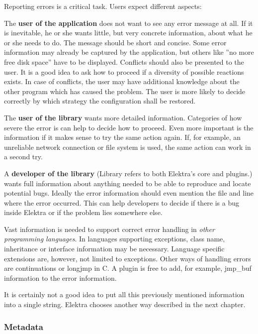 Reporting errors is a critical task. Users expect different aspects\+:


\begin{DoxyItemize}
\item The {\bfseries user of the application} does not want to see any error message at all. If it is inevitable, he or she wants little, but very concrete information, about what he or she needs to do. The message should be short and concise. Some error information may already be captured by the application, but others like ''no more free disk space'' have to be displayed. Conflicts should also be presented to the user. It is a good idea to ask how to proceed if a diversity of possible reactions exists. In case of conflicts, the user may have additional knowledge about the other program which has caused the problem. The user is more likely to decide correctly by which strategy the configuration shall be restored.
\item The {\bfseries user of the library} wants more detailed information. Categories of how severe the error is can help to decide how to proceed. Even more important is the information if it makes sense to try the same action again. If, for example, an unreliable network connection or file system is used, the same action can work in a second try.
\item A {\bfseries developer of the library} (Library refers to both Elektra's core and plugins.) wants full information about anything needed to be able to reproduce and locate potential bugs. Ideally the error information should even mention the file and line where the error occurred. This can help developers to decide if there is a bug inside Elektra or if the problem lies somewhere else.
\item Vast information is needed to support correct error handling in {\itshape other programming languages}. In languages supporting exceptions, class name, inheritance or interface information may be necessary. Language specific extensions are, however, not limited to exceptions. Other ways of handling errors are continuations or {\ttfamily longjmp} in C. A plugin is free to add, for example, {\ttfamily jmp\+\_\+buf} information to the error information.
\end{DoxyItemize}

It is certainly not a good idea to put all this previously mentioned information into a single string. Elektra chooses another way described in the next chapter.

\subsubsection*{Metadata}

